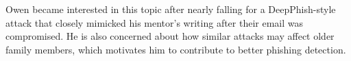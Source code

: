 \documentclass[sigconf]{acmart}
\begin{document}
\begin{bibunit}
Owen became interested in this topic after nearly falling for a DeepPhish-style attack that closely mimicked his mentor’s writing after their email was compromised. He is also concerned about how similar attacks may affect older family members, which motivates him to contribute to better phishing detection.
\putbib[bibliography2]
\end{bibunit}
\end{document}
